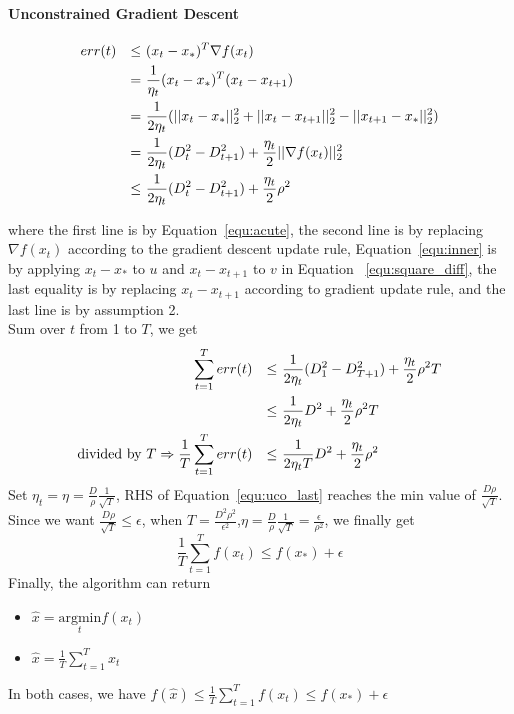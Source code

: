 \documentclass[11pt]{article}
\begin{document}
\paragraph{Unconstrained Gradient Descent}

\begin{alignat}{4}
err(t) && \leq &~(x_t-x_*)^T\nabla f(x_t) \notag\\
       && = &~\frac{1}{\eta_t}(x_t-x_*)^T(x_t-x_{t+1}) \notag \\
       && = &~\frac{1}{2\eta_t}(||x_t - x_*||_2^2 + ||x_t - x_{t+1}||_2^2 - ||x_{t+1}-x_*||_2^2) \label{equ:inner}\\
       && = &~\frac{1}{2\eta_t}(D_t^2 - D_{t+1}^2) + \frac{\eta_t}{2}||\nabla f(x_t)||_2^2 \label{equ:cvx_grad_uc}\\
       && \leq &~ \frac{1}{2\eta_t}(D_t^2 - D_{t+1}^2) + \frac{\eta_t}{2}\rho^2
\end{alignat}

where the first line is by Equation~\ref{equ:acute}, the second line is by replacing $\nabla f(x_t)$ according to the gradient descent update rule, Equation~\ref{equ:inner} is by applying $x_t - x_*$ to $u$ and $x_t - x_{t+1}$ to $v$ in Equation ~\ref{equ:square_diff}, the last equality is by replacing $x_t - x_{t+1}$ according to gradient update rule, and the last line is by assumption 2.\\

Sum over $t$ from 1 to $T$, we get \\


\begin{alignat}{2}
\sum_{t=1}^T err(t) && \leq &~  \frac{1}{2\eta_t}
(D_1^2 - D_{T+1}^2) + \frac{\eta_t}{2}\rho^2 T \notag \\
                     && \leq &~ \frac{1}{2\eta_t}D^2 + \frac{\eta_t}{2}\rho^2 T \notag \\
\text{divided by } T \Rightarrow \frac{1}{T}\sum_{t=1}^T err(t) && \leq &~ \frac{1}{2\eta_t T}D^2 + \frac{\eta_t}{2}\rho^2 \label{equ:uco_last}
\end{alignat}
Set $\eta_t = \eta = \frac{D}{\rho}\frac{1}{\sqrt{T}}$, RHS of Equation~\ref{equ:uco_last} reaches the min value of $\frac{D\rho}{\sqrt{T}}$. Since we want $\frac{D\rho}{\sqrt{T}} \leq \epsilon $, when $T=\frac{D^2\rho^2}{\epsilon^2}$,$\eta = \frac{D}{\rho}\frac{1}{\sqrt{T}} = \frac{\epsilon}{\rho^2}$, we finally get 
\begin{equation}
    \frac{1}{T}\sum_{t=1}^T f(x_t) \leq f(x_*) +\epsilon
\label{equ:err_final}
\end{equation}
Finally, the algorithm can return 
\begin{itemize}
    \item $\hat{x} = \underset{t}{\text{argmin}}f(x_t)$
    \item $\hat{x} = \frac{1}{T}\sum_{t=1}^T x_t$
\end{itemize}
In both cases, we have $f(\hat{x}) \leq  \frac{1}{T}\sum_{t=1}^T f(x_t) \leq f(x_*) +\epsilon$ \\
\end{document}
